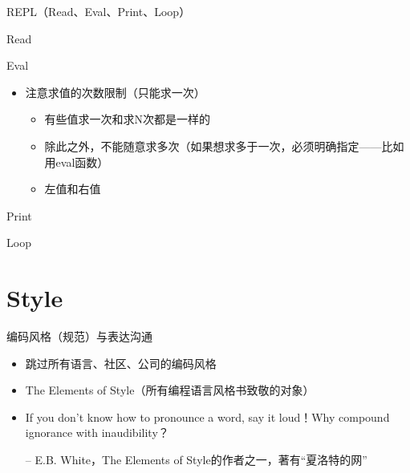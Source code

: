 \documentclass[presentation,dvipdfmx,CJKbookmarks]{beamer}
\begin{document}
\begin{CJK*}{UTF8}{simsun}
\begin{frame}[label={sec:org064ae42}]{REPL（Read、Eval、Print、Loop）}
\begin{block}{Read}
\end{block}
\begin{block}{Eval}
\begin{itemize}
\item 注意求值的次数限制（只能求一次）
\begin{itemize}
\item 有些值求一次和求\thinspace N\thinspace 次都是一样的
\item 除此之外，不能随意求多次（如果想求多于一次，必须明确指定——比如用\thinspace eval\thinspace 函数）
\item 左值和右值
\end{itemize}
\end{itemize}
\end{block}

\begin{block}{Print}
\end{block}
\begin{block}{Loop}
\end{block}
\end{frame}

\section{Style}
\label{sec:org62d627c}

\begin{frame}[fragile,label={sec:orgf4bb7dc}]{编码风格（规范）与表达沟通}
 \begin{itemize}
\item 跳过所有语言、社区、公司的编码风格
\item The Elements of Style（所有编程语言风格书致敬的对象）
\item If you don't know how to pronounce a word, say it loud！Why compound ignorance with inaudibility？

-- E.B. White，The Elements of Style\thinspace 的作者之一，著有“夏洛特的网”


\end{itemize}
\end{frame}
\end{CJK*}
\end{document}
